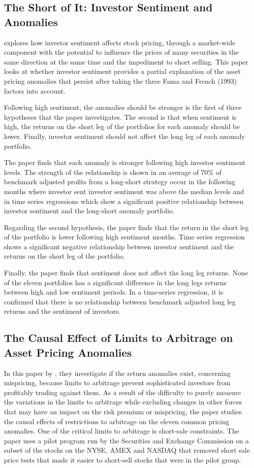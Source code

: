 \documentclass[12pt, a4paper, oneside]{article}
\begin{document}
\subsection{The Short of It: Investor Sentiment and Anomalies}
 explores how investor sentiment affects stock pricing, through a market-wide component with the potential to influence the prices of many securities in the same direction at the same time and the impediment to short selling. This paper looks at whether investor sentiment provides a partial explanation of the asset pricing anomalies that persist after taking the three Fama and French (1993) factors into account.

Following high sentiment, the anomalies should be stronger is the first of three hypotheses that the paper investigates. The second is that when sentiment is high, the returns on the short leg of the portfolios for each anomaly should be lower. Finally, investor sentiment should not affect the long leg of each anomaly portfolio. 

The paper finds that each anomaly is stronger following high investor sentiment levels. The strength of the relationship is shown in an average of 70\% of benchmark adjusted profits from a long-short strategy occur in the following months where investor sent investor sentiment was above the median levels and in time series regressions which show a significant positive relationship between investor sentiment and the long-short anomaly portfolio. 

Regarding the second hypothesis, the paper finds that the return in the short leg of the portfolio is lower following high sentiment months. Time series regression shows a significant negative relationship between investor sentiment and the returns on the short leg of the portfolio.

Finally, the paper finds that sentiment does not affect the long leg returns. None of the eleven portfolios has a significant difference in the long legs returns between high and low sentiment periods. In a time-series regression, it is confirmed that there is no relationship between benchmark adjusted long leg returns and the sentiment of investors.

\subsection{The Causal Effect of Limits to Arbitrage on Asset Pricing Anomalies}
In this paper by , they investigate if the return anomalies exist, concerning mispricing, because limits to arbitrage prevent sophisticated investors from profitably trading against them. As a result of the difficulty to purely measure the variations in the limits to arbitrage while excluding changes in other forces that may have an impact on the risk premium or mispricing, the paper studies the causal effects of restrictions to arbitrage on the eleven common pricing anomalies. One of the critical limits to arbitrage is short-sale constraints. The paper uses a pilot program run by the Securities and Exchange Commission on a subset of the stocks on the NYSE, AMEX and NASDAQ that removed short sale price tests that made it easier to short-sell stocks that were in the pilot group. 
\end{document}
